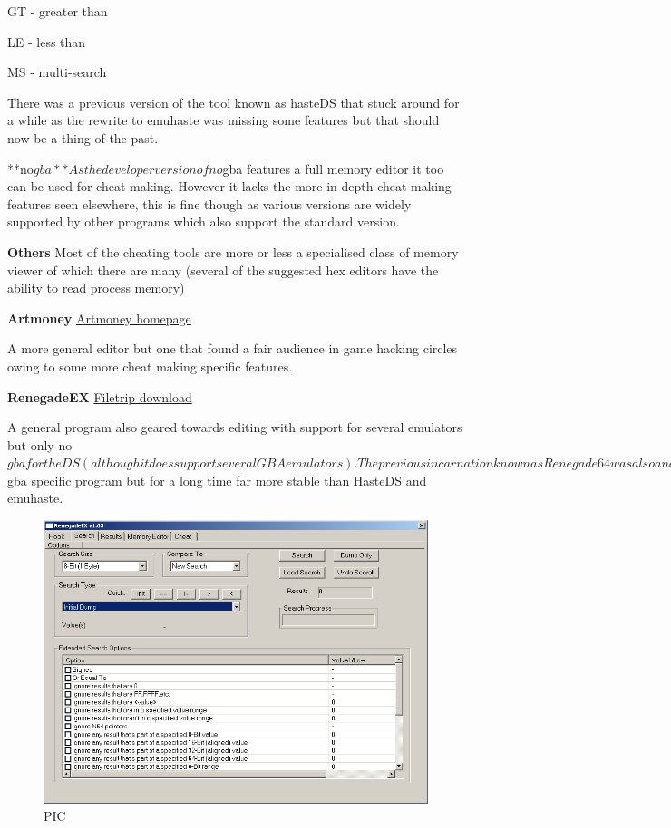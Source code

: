 \documentclass[
]{book}
\begin{document}
GT - greater than

LE - less than

MS - multi-search

There was a previous version of the tool known as hasteDS that stuck around for a while as the rewrite to emuhaste was missing some features but that should now be a thing of the past.

**no\(gba** As the developer version of no\)gba features a full memory editor it too can be used for cheat making. However it lacks the more in depth cheat making features seen elsewhere, this is fine though as various versions are widely supported by other programs which also support the standard version.

\textbf{Others} Most of the cheating tools are more or less a specialised class of memory viewer of which there are many (several of the suggested hex editors have the ability to read process memory)

\textbf{Artmoney} \href{http://www.artmoney.ru/}{Artmoney homepage}

A more general editor but one that found a fair audience in game hacking circles owing to some more cheat making specific features.

\textbf{RenegadeEX} \href{http://filetrip.net/pc-downloads/applications/download-renegadeex-105-f29011.html}{Filetrip download}

A general program also geared towards editing with support for several emulators but only no\(gba for the DS (although it does support several GBA emulators). The previous incarnation known as Renegade64 was also a no\)gba specific program but for a long time far more stable than HasteDS and emuhaste.

\begin{figure}
\centering
\includegraphics{images/200_home_fast6191_romhackingguide_unrenamed_fil___al_borders_romhackingguidecheatsrenegadeEX1.png}
\caption{PIC}
\end{figure}
\end{document}
